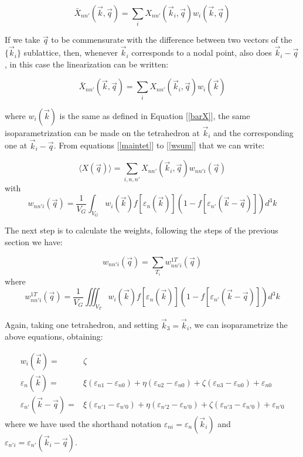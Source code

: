 \documentclass[10pt]{article}
\begin{document}
\begin{equation}\label{barxq}
\bar{X}_{nn'}(\vec{k},\vec{q})=\sum\limits_i{X_{nn'}(\vec{k}_i,\vec{q})w_i(\vec{k},\vec{q})}
\end{equation}

If we take $\vec{q}$ to be
commensurate with the difference between two vectors of the $\{\vec{k}_i\}$ sublattice, then, whenever
$\vec{k}_i$ corresponds to a nodal point, also does $\vec{k}_i-\vec{q}$, in this case the linearization
can be written:

\begin{equation}\label{barxq1}
\bar{X}_{nn'}(\vec{k},\vec{q})=\sum\limits_i{X_{nn'}(\vec{k}_i,\vec{q})w_i(\vec{k})}
\end{equation}

where $w_i(\vec{k})$ is the same as defined in Equation [\ref{barX}], the same isoparametrization can be
made on the tetrahedron at $\vec{k}_i$ and the corresponding one at $\vec{k}_i-\vec{q}$. From equations
[\ref{maintet}] to [\ref{wsum}] that we can write:

\begin{equation}\label{manconv}
\langle X(\vec{q})\rangle=\sum\limits_{i,n,n'}{X_{nn'}(\vec{k}_i,\vec{q}) w_{nn'i}(\vec{q})}
\end{equation}
with
\begin{equation}\label{weightq}
w_{nn'i}(\vec{q})=\frac{1}{V_G}\int_{V_G}{w_i(\vec{k})f[\varepsilon_n(\vec{k})]%
\left(1-f[\varepsilon_{n'}(\vec{k}-\vec{q})]\right)d^3k}
\end{equation}

The next step is to calculate the weights, following the steps of the previous section we have:

\begin{equation}\label{wiq}
w_{nn'i}(\vec{q})=\sum\limits_{T_i}{w_{nn'i}^{1T}}(\vec{q})
\end{equation}
where
\begin{equation}\label{w1T}
{w_{nn'i}^{1T}}(\vec{q})=\frac{1}{V_G}\iiint_{V_T}{w_i(\vec{k})f[\varepsilon_n(\vec{k})]%
\left(1-f[\varepsilon_{n'}(\vec{k}-\vec{q})]\right)d^3k}
\end{equation}

Again, taking one tetrahedron, and setting $\vec{k}_3=\vec{k}_i$, we can isoparametrize the above equations, obtaining:

\begin{subequations}\label{isowepq}
\begin{align}
w_i(\vec{k})=&\zeta \\
\varepsilon_{n}(\vec{k})=&\xi(\varepsilon_{n1}-\varepsilon_{n0})+%
\eta(\varepsilon_{n2}-\varepsilon_{n0})+%
\zeta(\varepsilon_{n3}-\varepsilon_{n0})+\varepsilon_{n0}\\
\varepsilon_{n'}(\vec{k}-\vec{q})=&\xi(\varepsilon_{n'1}-\varepsilon_{n'0})+%
\eta(\varepsilon_{n'2}-\varepsilon_{n'0})+%
\zeta(\varepsilon_{n'3}-\varepsilon_{n'0})+\varepsilon_{n'0}
\end{align}
\end{subequations}
where we have used the shorthand notation $\varepsilon_{ni}=\varepsilon_{n}(\vec{k}_i)$ and
$\varepsilon_{n'i}=\varepsilon_{n'}(\vec{k}_i-\vec{q})$.\\
\end{document}
